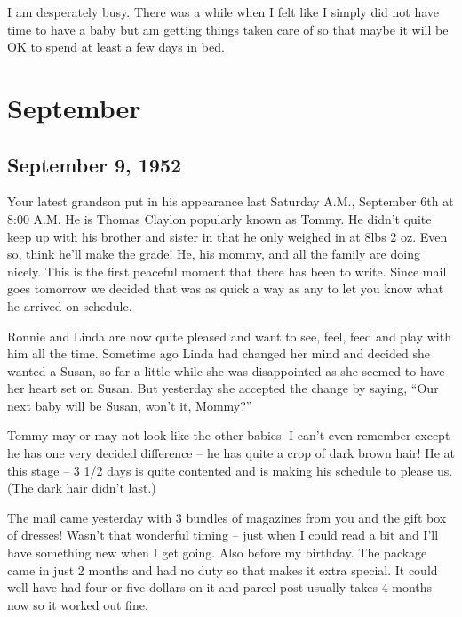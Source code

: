 \documentclass[
]{book}
\begin{document}
I am desperately busy. There was a while when I felt like I simply did not have time to have a baby but am getting things taken care of so that maybe it will be OK to spend at least a few days in bed.

\hypertarget{september-3}{%
\section{September}\label{september-3}}

\hypertarget{september-9-1952}{%
\subsection{September 9, 1952}\label{september-9-1952}}

Your latest grandson put in his appearance last Saturday A.M., September 6th at 8:00 A.M. He is Thomas Claylon popularly known as Tommy. He didn't quite keep up with his brother and sister in that he only weighed in at 8lbs 2 oz. Even so, think he'll make the grade! He, his mommy, and all the family are doing nicely. This is the first peaceful moment that there has been to write. Since mail goes tomorrow we decided that was as quick a way as any to let you know what he arrived on schedule.

Ronnie and Linda are now quite pleased and want to see, feel, feed and play with him all the time. Sometime ago Linda had changed her mind and decided she wanted a Susan, so far a little while she was disappointed as she seemed to have her heart set on Susan. But yesterday she accepted the change by saying, ``Our next baby will be Susan, won't it, Mommy?''

Tommy may or may not look like the other babies. I can't even remember except he has one very decided difference -- he has quite a crop of dark brown hair! He at this stage -- 3 1/2 days is quite contented and is making his schedule to please us. (The dark hair didn't last.)

The mail came yesterday with 3 bundles of magazines from you and the gift box of dresses! Wasn't that wonderful timing -- just when I could read a bit and I'll have something new when I get going. Also before my birthday. The package came in just 2 months and had no duty so that makes it extra special. It could well have had four or five dollars on it and parcel post usually takes 4 months now so it worked out fine.
\end{document}
